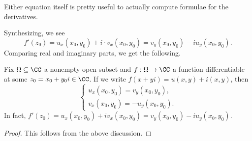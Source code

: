 \begin{remark}
	Either equation itself is pretty useful to actually compute formulae for the derivatives.
\end{remark}
Synthesizing, we see
\[f'(z_0)=u_x(x_0,y_0)+i\cdot v_x(x_0,y_0)=v_y(x_0,y_0)-iu_y(x_0,y_0).\]
Comparing real and imaginary parts, we get the following.
\begin{theorem} \label{thm:crnecessary}
	Fix $\Omega\subseteq\CC$ a nonempty open subset and $f:\Omega\to\CC$ a function differentiable at some $z_0=x_0+y_0i\in\CC$. If we write $f(x+yi)=u(x,y)+i(x,y)$, then
	\[\begin{cases}
		u_x(x_0,y_0)=v_y(x_0,y_0), \\
		v_x(x_0,y_0)=-u_y(x_0,y_0).
	\end{cases}\]
	In fact, $f'(z_0)=u_x(x_0,y_0)+iv_x(x_0,y_0)=v_y(x_0,y_0)-iu_y(x_0,y_0)$.
\end{theorem}
\begin{proof}
	This follows from the above discussion.
\end{proof}

